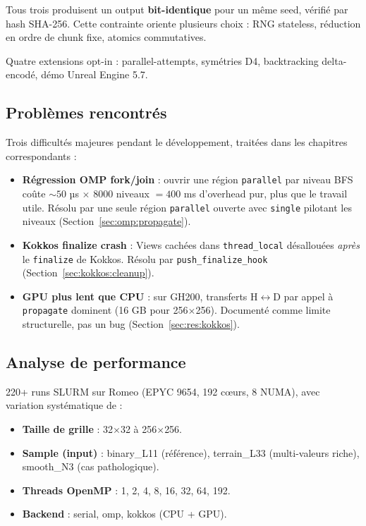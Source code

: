 Tous trois produisent un output \textbf{bit-identique} pour un même seed, vérifié par hash SHA-256. Cette contrainte oriente plusieurs choix : RNG stateless, réduction en ordre de chunk fixe, atomics commutatives.

Quatre extensions opt-in : parallel-attempts, symétries D4, backtracking delta-encodé, démo Unreal Engine 5.7.

\subsection{Problèmes rencontrés}

Trois difficultés majeures pendant le développement, traitées dans les chapitres correspondants :

\begin{itemize}
    \item \textbf{Régression OMP fork/join} : ouvrir une région \texttt{parallel} par niveau BFS coûte $\sim 50$ µs $\times$ 8000 niveaux $= 400$ ms d'overhead pur, plus que le travail utile. Résolu par une seule région \texttt{parallel} ouverte avec \texttt{single} pilotant les niveaux (Section~\ref{sec:omp:propagate}).
    \item \textbf{Kokkos finalize crash} : Views cachées dans \texttt{thread\_local} désallouées \emph{après} le \texttt{finalize} de Kokkos. Résolu par \texttt{push\_finalize\_hook} (Section~\ref{sec:kokkos:cleanup}).
    \item \textbf{GPU plus lent que CPU} : sur GH200, transferts H$\leftrightarrow$D par appel à \texttt{propagate} dominent (16 GB pour 256$\times$256). Documenté comme limite structurelle, pas un bug (Section~\ref{sec:res:kokkos}).
\end{itemize}

\subsection{Analyse de performance}

220+ runs SLURM sur Romeo (EPYC 9654, 192 cœurs, 8 NUMA), avec variation systématique de :

\begin{itemize}
    \item \textbf{Taille de grille} : 32$\times$32 à 256$\times$256.
    \item \textbf{Sample (input)} : binary\_L11 (référence), terrain\_L33 (multi-valeurs riche), smooth\_N3 (cas pathologique).
    \item \textbf{Threads OpenMP} : 1, 2, 4, 8, 16, 32, 64, 192.
    \item \textbf{Backend} : serial, omp, kokkos (CPU + GPU).
\end{itemize}

